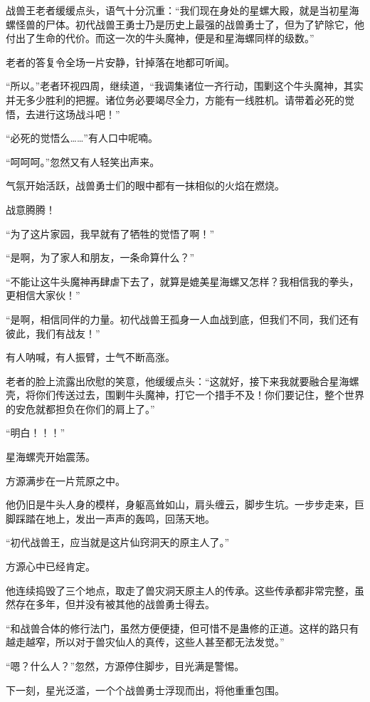 \begin{this_body}
战兽王老者缓缓点头，语气十分沉重：“我们现在身处的星螺大殿，就是当初星海螺怪兽的尸体。初代战兽王勇士乃是历史上最强的战兽勇士了，但为了铲除它，他付出了生命的代价。而这一次的牛头魔神，便是和星海螺同样的级数。”

老者的答复令全场一片安静，针掉落在地都可听闻。

“所以。”老者环视四周，继续道，“我调集诸位一齐行动，围剿这个牛头魔神，其实并无多少胜利的把握。诸位务必要竭尽全力，方能有一线胜机。请带着必死的觉悟，去进行这场战斗吧！”

“必死的觉悟么……”有人口中呢喃。

“呵呵呵。”忽然又有人轻笑出声来。

气氛开始活跃，战兽勇士们的眼中都有一抹相似的火焰在燃烧。

战意腾腾！

“为了这片家园，我早就有了牺牲的觉悟了啊！”

“是啊，为了家人和朋友，一条命算什么？”

“不能让这牛头魔神再肆虐下去了，就算是媲美星海螺又怎样？我相信我的拳头，更相信大家伙！”

“是啊，相信同伴的力量。初代战兽王孤身一人血战到底，但我们不同，我们还有彼此，我们有战友！”

有人呐喊，有人振臂，士气不断高涨。

老者的脸上流露出欣慰的笑意，他缓缓点头：“这就好，接下来我就要融合星海螺壳，将你们传送过去，围剿牛头魔神，打它一个措手不及！你们要记住，整个世界的安危就都担负在你们的肩上了。”

“明白！！！”

星海螺壳开始震荡。

方源满步在一片荒原之中。

他仍旧是牛头人身的模样，身躯高耸如山，肩头缠云，脚步生坑。一步步走来，巨脚踩踏在地上，发出一声声的轰鸣，回荡天地。

“初代战兽王，应当就是这片仙窍洞天的原主人了。”

方源心中已经肯定。

他连续捣毁了三个地点，取走了兽灾洞天原主人的传承。这些传承都非常完整，虽然存在多年，但并没有被其他的战兽勇士得去。

“和战兽合体的修行法门，虽然方便便捷，但可惜不是蛊修的正道。这样的路只有越走越窄，所以对于兽灾仙人的真传，这些人甚至都无法发觉。”

“嗯？什么人？”忽然，方源停住脚步，目光满是警惕。

下一刻，星光泛滥，一个个战兽勇士浮现而出，将他重重包围。


\end{this_body}
